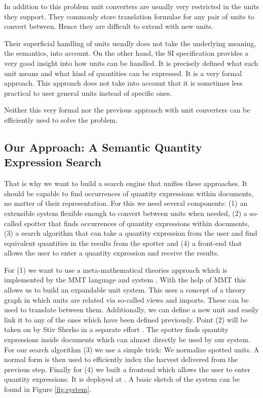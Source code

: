 In addition to this problem unit converters are usually very restricted in the units they support. They commonly store translation formulae for any pair of units to convert between. Hence they are difficult to extend with new units.

Their superficial handling of units usually does not take the underlying meaning, the semantics, into account. On the other hand, the SI specification \cite{sispec} provides a very good insight into how units can be handled. It is precisely defined what each unit means and what kind of quantities can be expressed. It is a very formal approach. This approach does not take into account that it is sometimes less practical to user general units instead of specific ones.

Neither this very formal nor the previous approach with unit converters can be efficiently used to solve the problem.

\subsection{Our Approach: A Semantic Quantity Expression Search}

That is why we want to build a search engine that unifies these approaches. It should be capable to find occurrences of quantity expressions within documents, no matter of their representation. For this we need several components: (1) an extensible system flexible enough to convert between units when needed, (2) a so-called spotter that finds occurrences of quantity expressions within documents, (3) a search algorithm that can take a quantity expression from the user and find equivalent quantities in the results from the spotter and (4) a front-end that allows the user to enter a quantity expression and receive the results.

For (1) we want to use a meta-mathematical theories approach which is implemented by the MMT language and system \cite{RabKoh:WSMSML13}. With the help of MMT this allows us to build an expandable unit system. This uses a concept of a theory graph in which units are related via so-called views and imports. These can be used to translate between them. Additionally, we can define a new unit and easily link it to any of the ones which have been defined previously. Point (2) will be taken on by Stiv Sherko in a separate effort \cite{thesis:sharko}. The spotter finds quantity expressions inside documents which can almost directly be used by our system. For our search algorithm (3) we use a simple trick: We normalize spotted units. A normal form is then used to efficiently index the harvest delivered from the previous step. Finally for (4) we built a frontend which allows the user to enter quantity expressions. It is deployed at \cite{self:sqesdemo}. A basic sketch of the system can be found in Figure \ref{fig:system}.

